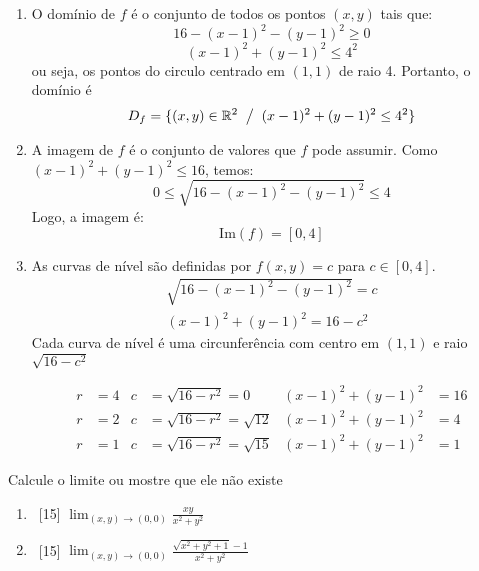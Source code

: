 \documentclass[a4paper,12pt,fleqn]{article}
\begin{document}
\begin{answer}
\begin{enumerate}[label=(\alph*)]
\item O domínio de $f$ é o conjunto de todos os pontos \((x, y)\) tais que:
  \[
    16 - (x-1)^2 - (y-1)^2 \geq 0
  \]
  \[
    (x-1)^2 + (y-1)^2 \leq 4^2
  \]
  ou seja, os pontos do circulo centrado em \((1, 1)\) de raio 4.
  Portanto, o domínio é
  \[
    D_f = \{(x, y) \in \mathbb{R}^2 \mathrel{}\big/\mathrel{} (x-1)^2 + (y-1)^2 \leq 4^2\}
  \]

\item A imagem de $f$ é o conjunto de valores que $f$ pode assumir.
  Como \( (x-1)^2 + (y-1)^2 \leq 16 \), temos:
  \[
    0 \leq \sqrt{16 - (x-1)^2 - (y-1)^2} \leq 4
  \]
  Logo, a imagem é:
  \[
    \text{Im}(f) = [0, 4]
  \]

\item As curvas de nível são definidas por $f(x,y) = c$ para $c \in [0, 4]$.
  \begin{gather*}
    \sqrt{16 - (x-1)^2 - (y-1)^2} = c \\
    (x-1)^2 + (y-1)^2 = 16 - c^2
  \end{gather*}
  Cada curva de nível é uma circunferência com
  centro em $(1, 1)$ e raio $\sqrt{16 - c^2}$

  \begin{align*}
    r & = 4 & c & = \sqrt{16 - r^2} = 0         & (x-1)^2 + (y-1)^2 & = 16 \\
    r & = 2 & c & = \sqrt{16 - r^2} = \sqrt{12} & (x-1)^2 + (y-1)^2 & = 4  \\
    r & = 1 & c & = \sqrt{16 - r^2} = \sqrt{15} & (x-1)^2 + (y-1)^2 & = 1
  \end{align*}
\end{enumerate}
\end{answer}

Calcule o limite ou mostre que ele não existe
\begin{enumerate}[label=(\alph*)]
  \item \ [15] \(\lim_{(x,y) \to (0,0)} \frac{xy}{x^2 + y^2}\)
  \item \ [15] \(\lim_{(x,y) \to (0,0)} \frac{\sqrt{x^2 + y^2 + 1} - 1}{x^2 + y^2} \)
\end{enumerate}
\clearpagequestiononly
\end{document}
